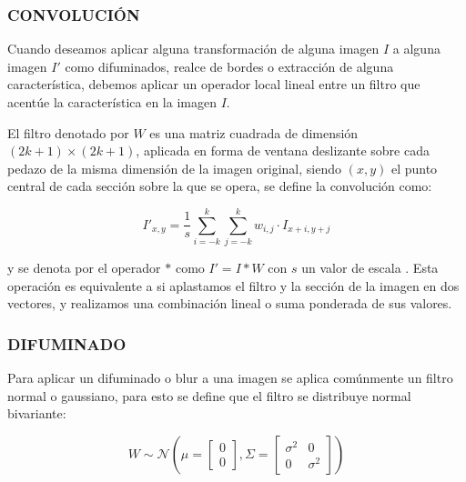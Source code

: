         \subsubsection{CONVOLUCIÓN}
        Cuando deseamos aplicar alguna transformación de alguna imagen $I$ a alguna imagen $I'$ como difuminados, realce de bordes o extracción de alguna característica, debemos aplicar un operador local lineal entre un filtro que acentúe la característica en la imagen $I$.
        
        El filtro denotado por $W$ es una matriz cuadrada de dimensión $(2k+1) \times (2k+1)$, aplicada en forma de ventana deslizante sobre cada pedazo de la misma dimensión de la imagen original, siendo $(x, y)$ el punto central de cada sección sobre la que se opera, se define la convolución como:
        
        \begin{equation}
            I'_{x,y} = \frac{1}{s} \sum_{i=-k}^{k} \sum_{j=-k}^{k} w_{i, j}\cdot I_{x+i, y+j}
        \end{equation}
        
        y se denota por el operador $*$ como $I' = I*W$ con $s$ un valor de escala \citep{10.5555/2584519}. Esta operación es equivalente a si aplastamos el filtro y la sección de la imagen en dos vectores, y realizamos una combinación lineal o suma ponderada de sus valores.
        \subsubsection{DIFUMINADO}
        Para aplicar un difuminado o blur a una imagen se aplica comúnmente un filtro normal o gaussiano, para esto se define que el filtro se distribuye normal bivariante:
        
        \begin{equation}
            W \sim \mathcal{N}\left(\mu=\begin{bmatrix}
                                    0\\
                                    0
                                    \end{bmatrix},
                                    \Sigma=
                                    \begin{bmatrix}
                                    \sigma^2 & 0\\
                                    0 & \sigma^2
                                    \end{bmatrix}\right)
        \end{equation}
        

